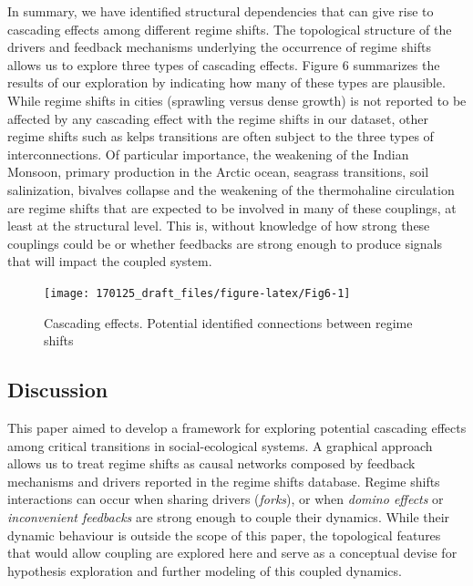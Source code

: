 \documentclass[9pt,]{article}
\begin{document}
In summary, we have identified structural dependencies that can give
rise to cascading effects among different regime shifts. The topological
structure of the drivers and feedback mechanisms underlying the
occurrence of regime shifts allows us to explore three types of
cascading effects. Figure 6 summarizes the results of our exploration by
indicating how many of these types are plausible. While regime shifts in
cities (sprawling versus dense growth) is not reported to be affected by
any cascading effect with the regime shifts in our dataset, other regime
shifts such as kelps transitions are often subject to the three types of
interconnections. Of particular importance, the weakening of the Indian
Monsoon, primary production in the Arctic ocean, seagrass transitions,
soil salinization, bivalves collapse and the weakening of the
thermohaline circulation are regime shifts that are expected to be
involved in many of these couplings, at least at the structural level.
This is, without knowledge of how strong these couplings could be or
whether feedbacks are strong enough to produce signals that will impact
the coupled system.

\begin{figure}

{\centering \texttt{[image: 170125\_draft\_files/figure-latex/Fig6-1]} 

}

\caption{Cascading effects. Potential identified connections between regime shifts}\label{fig:Fig6}
\end{figure}

\subsection{Discussion}\label{discussion}

This paper aimed to develop a framework for exploring potential
cascading effects among critical transitions in social-ecological
systems. A graphical approach allows us to treat regime shifts as causal
networks composed by feedback mechanisms and drivers reported in the
regime shifts database. Regime shifts interactions can occur when
sharing drivers (\emph{forks}), or when \emph{domino effects} or
\emph{inconvenient feedbacks} are strong enough to couple their
dynamics. While their dynamic behaviour is outside the scope of this
paper, the topological features that would allow coupling are explored
here and serve as a conceptual devise for hypothesis exploration and
further modeling of this coupled dynamics.
\end{document}
